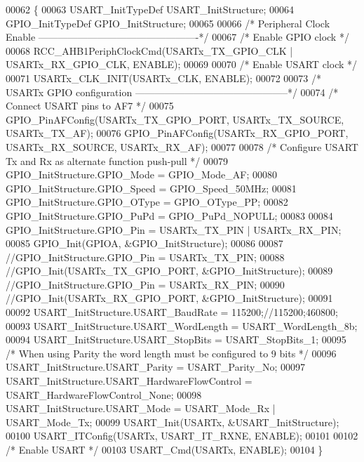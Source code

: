 \begin{DoxyCode}
00062 \{
00063   USART_InitTypeDef USART\_InitStructure;
00064   GPIO_InitTypeDef GPIO\_InitStructure;
00065 
00066   \textcolor{comment}{/* Peripheral Clock Enable -------------------------------------------------*/}
00067   \textcolor{comment}{/* Enable GPIO clock */}
00068   RCC_AHB1PeriphClockCmd(USARTx_TX_GPIO_CLK | USARTx_RX_GPIO_CLK, ENABLE);
00069   
00070   \textcolor{comment}{/* Enable USART clock */}
00071   USARTx_CLK_INIT(USARTx_CLK, ENABLE);
00072   
00073   \textcolor{comment}{/* USARTx GPIO configuration -----------------------------------------------*/} 
00074   \textcolor{comment}{/* Connect USART pins to AF7 */}
00075   GPIO_PinAFConfig(USARTx_TX_GPIO_PORT, USARTx_TX_SOURCE, USARTx_TX_AF);
00076   GPIO_PinAFConfig(USARTx_RX_GPIO_PORT, USARTx_RX_SOURCE, USARTx_RX_AF);
00077   
00078   \textcolor{comment}{/* Configure USART Tx and Rx as alternate function push-pull */}
00079   GPIO\_InitStructure.GPIO_Mode = GPIO_Mode_AF;
00080   GPIO\_InitStructure.GPIO_Speed = GPIO_Speed_50MHz;
00081   GPIO\_InitStructure.GPIO_OType = GPIO_OType_PP;
00082   GPIO\_InitStructure.GPIO_PuPd = GPIO_PuPd_NOPULL;
00083   
00084   GPIO\_InitStructure.GPIO_Pin = USARTx_TX_PIN | USARTx_RX_PIN;
00085   GPIO_Init(GPIOA, &GPIO\_InitStructure);
00086   
00087   \textcolor{comment}{//GPIO\_InitStructure.GPIO\_Pin = USARTx\_TX\_PIN;}
00088   \textcolor{comment}{//GPIO\_Init(USARTx\_TX\_GPIO\_PORT, &GPIO\_InitStructure);}
00089   \textcolor{comment}{//GPIO\_InitStructure.GPIO\_Pin = USARTx\_RX\_PIN;}
00090   \textcolor{comment}{//GPIO\_Init(USARTx\_RX\_GPIO\_PORT, &GPIO\_InitStructure);}
00091  
00092   USART\_InitStructure.USART_BaudRate =  115200;\textcolor{comment}{//115200;460800;}
00093   USART\_InitStructure.USART_WordLength = USART_WordLength_8b;
00094   USART\_InitStructure.USART_StopBits = USART_StopBits_1;
00095   \textcolor{comment}{/* When using Parity the word length must be configured to 9 bits */}
00096   USART\_InitStructure.USART_Parity = USART_Parity_No;
00097   USART\_InitStructure.USART_HardwareFlowControl = USART_HardwareFlowControl_None;
00098   USART\_InitStructure.USART_Mode = USART_Mode_Rx | USART_Mode_Tx;
00099   USART_Init(USARTx, &USART\_InitStructure);
00100   USART_ITConfig(USARTx, USART_IT_RXNE, ENABLE);
00101 
00102   \textcolor{comment}{/* Enable USART */}
00103   USART_Cmd(USARTx, ENABLE);
00104 \}
\end{DoxyCode}
